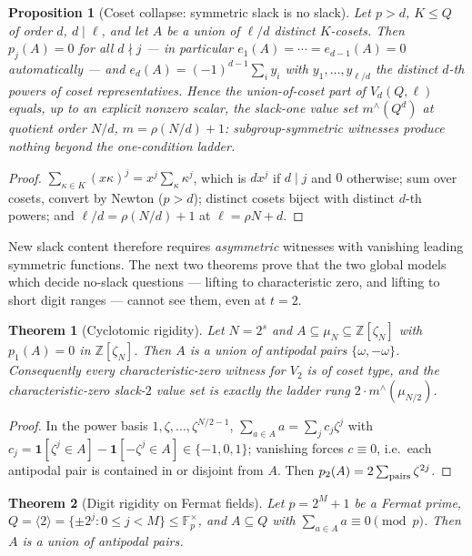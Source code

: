 \documentclass[11pt]{article}
\newtheorem{theorem}{Theorem}[section]
\newtheorem{proposition}[proposition]{Proposition}
\theoremstyle{definition}
\newcommand{\F}{\mathbb F}
\newcommand{\Z}{\mathbb Z}
\begin{document}
\begin{proposition}[Coset collapse: symmetric slack is no slack]\label{prop:collapse}
Let $p>d$, $K\le Q$ of order $d$, $d\mid\ell$, and let $A$ be a union of $\ell/d$ distinct $K$-cosets.  Then $p_j(A)=0$ for all $d\nmid j$ --- in particular $e_1(A)=\cdots=e_{d-1}(A)=0$ automatically --- and $e_d(A)=(-1)^{d-1}\sum_iy_i$ with $y_1,\dots,y_{\ell/d}$ the distinct $d$-th powers of coset representatives.  Hence the union-of-coset part of $V_d(Q,\ell)$ equals, up to an explicit nonzero scalar, the slack-\emph{one} value set $m^{\wedge}(Q^d)$ at quotient order $N/d$, $m=\rho(N/d)+1$: subgroup-symmetric witnesses produce nothing beyond the one-condition ladder.
\end{proposition}

\begin{proof}
$\sum_{\kappa\in K}(x\kappa)^j=x^j\sum_\kappa\kappa^j$, which is $dx^j$ if $d\mid j$ and $0$ otherwise; sum over cosets, convert by Newton ($p>d$); distinct cosets biject with distinct $d$-th powers; and $\ell/d=\rho(N/d)+1$ at $\ell=\rho N+d$.
\end{proof}

New slack content therefore requires \emph{asymmetric} witnesses with vanishing leading symmetric functions.  The next two theorems prove that the two global models which decide no-slack questions --- lifting to characteristic zero, and lifting to short digit ranges --- cannot see them, even at $t=2$.

\begin{theorem}[Cyclotomic rigidity]\label{thm:rigidcyclo}
Let $N=2^s$ and $A\subseteq\mu_N\subseteq\Z[\zeta_N]$ with $p_1(A)=0$ in $\Z[\zeta_N]$.  Then $A$ is a union of antipodal pairs $\{\omega,-\omega\}$.  Consequently every characteristic-zero witness for $V_2$ is of coset type, and the characteristic-zero slack-$2$ value set is exactly the ladder rung $2\cdot m^{\wedge}(\mu_{N/2})$.
\end{theorem}

\begin{proof}
In the power basis $1,\zeta,\dots,\zeta^{N/2-1}$, $\sum_{a\in A}a=\sum_jc_j\zeta^j$ with $c_j=\mathbf1[\zeta^j\in A]-\mathbf1[-\zeta^j\in A]\in\{-1,0,1\}$; vanishing forces $c\equiv0$, i.e.\ each antipodal pair is contained in or disjoint from $A$.  Then $p_2(A)=2\sum_{\rm pairs}\zeta^{2j}$.
\end{proof}

\begin{theorem}[Digit rigidity on Fermat fields]\label{thm:rigidfermat}
Let $p=2^M+1$ be a Fermat prime, $Q=\langle2\rangle=\{\pm2^j:0\le j<M\}\le\F_p^\times$, and $A\subseteq Q$ with $\sum_{a\in A}a\equiv0\pmod p$.  Then $A$ is a union of antipodal pairs.
\end{theorem}
\end{document}

